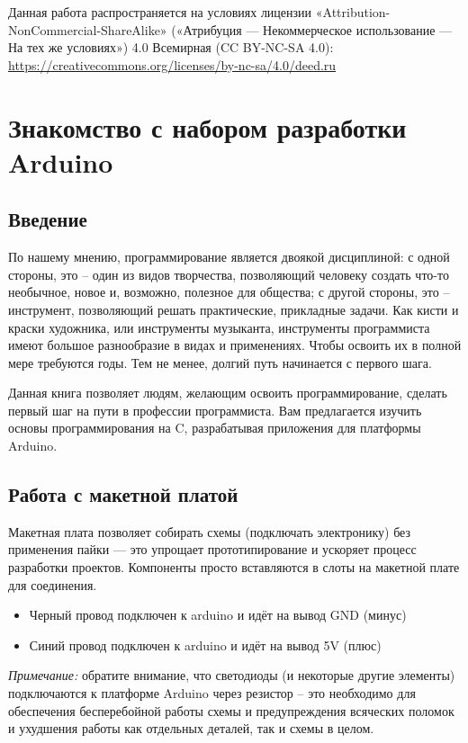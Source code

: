 \documentclass[a4paper,twoside]{book}
\begin{document}
Данная работа распространяется на условиях лицензии
«Attribution-NonCommercial-ShareAlike» («Атрибуция — Некоммерческое
использование — На тех же условиях») 4.0 Всемирная (CC BY-NC-SA 4.0):
\url{https://creativecommons.org/licenses/by-nc-sa/4.0/deed.ru}

\chapter{Знакомство с набором разработки Arduino}

\section{Введение}
По нашему мнению, программирование является двоякой дисциплиной: с одной
стороны, это – один из видов творчества, позволяющий человеку создать что-то
необычное, новое и, возможно, полезное для общества; с другой стороны, это –
инструмент, позволяющий решать практические, прикладные задачи. Как кисти и
краски художника, или инструменты музыканта, инструменты программиста имеют
большое разнообразие в видах и применениях. Чтобы освоить их в полной мере
требуются годы. Тем не менее, долгий путь начинается с первого шага.

Данная книга позволяет людям, желающим освоить программирование, сделать первый
шаг на пути в профессии программиста. Вам предлагается изучить основы
программирования на C, разрабатывая приложения для платформы Arduino.

\section{Работа с макетной платой}

Макетная плата позволяет собирать схемы (подключать электронику) без применения
пайки --- это упрощает прототипирование и ускоряет процесс разработки проектов.
Компоненты просто вставляются в слоты на макетной плате для соединения.

\begin{itemize}
\item Черный провод подключен к arduino и идёт на вывод GND (минус)
\item Синий провод подключен к arduino и идёт на вывод 5V (плюс)
\end{itemize}

\emph{Примечание:} обратите внимание, что светодиоды (и некоторые другие
элементы) подключаются к платформе Arduino через резистор -- это необходимо для
обеспечения бесперебойной работы схемы и предупреждения всяческих поломок и
ухудшения работы как отдельных деталей, так и схемы в целом.
\end{document}
